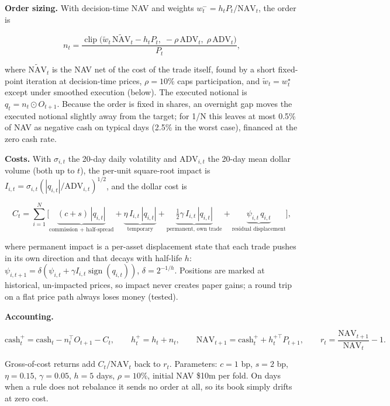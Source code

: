 \documentclass[11pt]{article}
\begin{document}
\textbf{Order sizing.} With decision-time NAV and weights \(w^-_t = h_tP_t/\mathrm{NAV}_t\), the order is

\[ n_t = \frac{\operatorname{clip}\!\big(\tilde w_t\,\widetilde{\mathrm{NAV}}_t - h_t P_t,\; -\rho\,\mathrm{ADV}_t,\; \rho\,\mathrm{ADV}_t\big)}{P_t}, \]

where \(\widetilde{\mathrm{NAV}}_t\) is the NAV net of the cost of the trade itself, found by a short fixed-point iteration at decision-time prices, \(\rho = 10\%\) caps participation, and \(\tilde w_t = w^\star_t\) except under smoothed execution (below). The executed notional is \(q_t = n_t \odot O_{t+1}\). Because the order is fixed in shares, an overnight gap moves the executed notional slightly away from the target; for 1/N this leaves at most 0.5\% of NAV as negative cash on typical days (2.5\% in the worst case), financed at the zero cash rate.

\textbf{Costs.} With \(\sigma_{i,t}\) the 20-day daily volatility and \(\mathrm{ADV}_{i,t}\) the 20-day mean dollar volume (both up to \(t\)), the per-unit square-root impact is \(I_{i,t} = \sigma_{i,t}(|q_{i,t}|/\mathrm{ADV}_{i,t})^{1/2}\), and the dollar cost is

\[ C_t = \sum_{i=1}^{N}\Big[\underbrace{(c+s)\,|q_{i,t}|}_{\text{commission + half-spread}} + \underbrace{\eta\, I_{i,t}\,|q_{i,t}|}_{\text{temporary}} + \underbrace{\tfrac12\gamma\, I_{i,t}\,|q_{i,t}|}_{\text{permanent, own trade}} + \underbrace{\psi_{i,t}\, q_{i,t}}_{\text{residual displacement}}\Big], \]

where permanent impact is a per-asset displacement state that each trade pushes in its own direction and that decays with half-life \(h\): \(\psi_{i,t+1} = \delta(\psi_{i,t} + \gamma I_{i,t}\operatorname{sign}(q_{i,t}))\), \(\delta = 2^{-1/h}\). Positions are marked at historical, un-impacted prices, so impact never creates paper gains; a round trip on a flat price path always loses money (tested).

\textbf{Accounting.}

\[ \text{cash}^{+}_t = \text{cash}_t - n_t^\top O_{t+1} - C_t,\qquad h^{+}_t = h_t + n_t,\qquad \mathrm{NAV}_{t+1} = \text{cash}^{+}_t + h^{+\top}_t P_{t+1},\qquad r_t = \frac{\mathrm{NAV}_{t+1}}{\mathrm{NAV}_t} - 1 . \]

Gross-of-cost returns add \(C_t/\mathrm{NAV}_t\) back to \(r_t\). Parameters: \(c = 1\) bp, \(s = 2\) bp, \(\eta = 0.15\), \(\gamma = 0.05\), \(h = 5\) days, \(\rho = 10\%\), initial NAV \$10m per fold. On days when a rule does not rebalance it sends no order at all, so its book simply drifts at zero cost.
\end{document}
